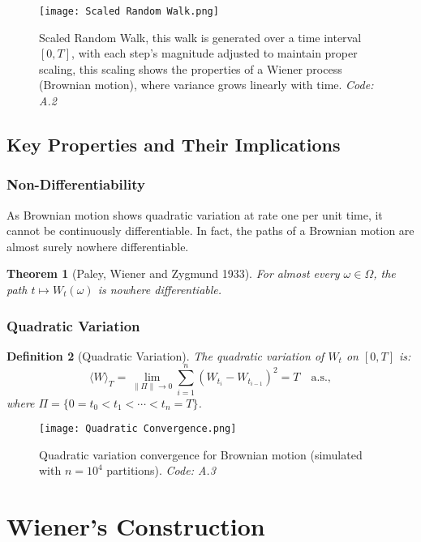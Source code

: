 \documentclass[12pt]{report}
\newtheorem{theorem}{Theorem}[section]
\newtheorem{definition}[theorem]{Definition}
\begin{document}
\begin{figure}[H]
    \centering
    \texttt{[image: Scaled Random Walk.png]}
    \caption{Scaled Random Walk, this walk is generated over a time interval $[0, T]$, with each step's magnitude adjusted to maintain proper scaling, this scaling shows the properties of a Wiener process (Brownian motion), where variance grows linearly with time. \textit{Code: A.2}}
    \label{fig:enter-label}
\end{figure}

\section{Key Properties and Their Implications}
\subsection{Non-Differentiability}
As Brownian motion shows quadratic variation at rate one per unit time, it cannot be continuously diﬀerentiable. In fact, the paths of a Brownian motion are almost surely nowhere diﬀerentiable.
\begin{theorem}[Paley, Wiener and Zygmund 1933]
For almost every \(\omega \in \Omega\), the path \(t \mapsto W_t(\omega)\) is nowhere differentiable.
\end{theorem}

\subsection{Quadratic Variation}
\begin{definition}[Quadratic Variation]
The quadratic variation of \(W_t\) on \([0, T]\) is:
\[
\langle W \rangle_T = \lim_{\|\Pi\| \to 0} \sum_{i=1}^n (W_{t_i} - W_{t_{i-1}})^2 = T \quad \text{a.s.},
\]
where \(\Pi = \{0 = t_0 < t_1 < \cdots < t_n = T\}\).
\end{definition}

\begin{figure}[H]
    \centering
    \texttt{[image: Quadratic Convergence.png]}
    \caption{Quadratic variation convergence for Brownian motion (simulated with \(n=10^4\) partitions). \textit{Code: A.3}}
    \label{fig:qv}
\end{figure}

\chapter{Wiener’s Construction}
\end{document}
